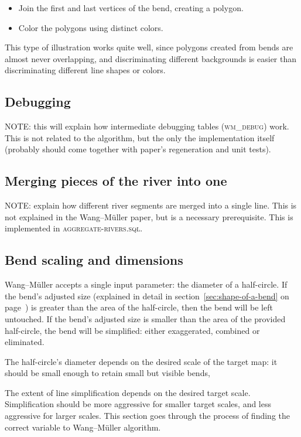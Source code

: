 \documentclass[a4paper]{article}
\newcommand{\onpage}[1]{\ref{#1} on page~\pageref{#1}}
\newcommand{\WM}{Wang--M{\"u}ller}
\begin{document}
\begin{itemize}
    \item Join the first and last vertices of the bend, creating a polygon.
    \item Color the polygons using distinct colors.
\end{itemize}

This type of illustration works quite well, since polygons created from bends
are almost never overlapping, and discriminating different backgrounds is
easier than discriminating different line shapes or colors.

\subsection{Debugging}

NOTE: this will explain how intermediate debugging tables (\textsc{wm\_debug})
work. This is not related to the algorithm, but the only the implementation
itself (probably should come together with paper's regeneration and unit
tests).

\subsection{Merging pieces of the river into one}

NOTE: explain how different river segments are merged into a single line. This
is not explained in the {\WM} paper, but is a necessary prerequisite. This is
implemented in \textsc{aggregate-rivers.sql}.

\subsection{Bend scaling and dimensions}
\label{sec:bend-scaling-and-dimensions}

{\WM} accepts a single input parameter: the diameter of a half-circle. If the
bend's adjusted size (explained in detail in
section~\onpage{sec:shape-of-a-bend}) is greater than the area of the
half-circle, then the bend will be left untouched. If the bend's adjusted size
is smaller than the area of the provided half-circle, the bend will be
simplified: either exaggerated, combined or eliminated.

The half-circle's diameter depends on the desired scale of the target map: it
should be small enough to retain small but visible bends,

The extent of line simplification depends on the desired target scale.
Simplification should be more aggressive for smaller target scales, and
less aggressive for larger scales. This section goes through the process
of finding the correct variable to {\WM} algorithm.
\end{document}
